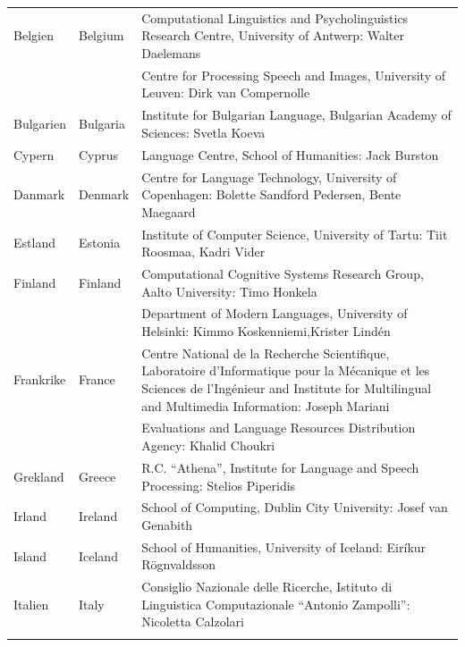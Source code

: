 \small
\begin{longtable}{llp{114mm}}
  Belgien & \textcolor{grey1}{Belgium} & Computational Linguistics and Psycholinguistics Research Centre, University of Antwerp: Walter Daelemans\\ \addlinespace
  & & Centre for Processing Speech and Images, University of Leuven: Dirk van Compernolle \\ \addlinespace
  Bulgarien & \textcolor{grey1}{Bulgaria} & Institute for Bulgarian Language, Bulgarian Academy of Sciences: Svetla Koeva \\ \addlinespace
  Cypern &  \textcolor{grey1}{Cyprus} & Language Centre, School of Humanities: Jack Burston\\ \addlinespace
  Danmark &  \textcolor{grey1}{Denmark} & Centre for Language Technology, University of Copenhagen: \newline Bolette Sandford Pedersen, Bente Maegaard\\ \addlinespace
  Estland & \textcolor{grey1}{Estonia} & Institute of Computer Science, University of Tartu: Tiit Roosmaa, Kadri Vider\\ \addlinespace
  Finland & \textcolor{grey1}{Finland} & Computational Cognitive Systems Research Group, Aalto University: Timo Honkela\\ \addlinespace
  & & Department of Modern Languages, University of Helsinki: Kimmo Koskenniemi,\newline Krister Lindén \\ \addlinespace
  Frankrike & \textcolor{grey1}{France} & Centre National de la Recherche Scientifique, Laboratoire d'Informatique pour la Mécanique et les Sciences de l'Ingénieur and Institute for Multilingual and Multimedia Information: Joseph Mariani \\ \addlinespace
  & & Evaluations and Language Resources Distribution Agency: Khalid Choukri\\ \addlinespace
  Grekland & \textcolor{grey1}{Greece} & R.C. “Athena”, Institute for
  Language and Speech Processing: Stelios Piperidis\\ \addlinespace
  Irland & \textcolor{grey1}{Ireland} & School of Computing, Dublin City University: Josef van Genabith\\ \addlinespace
  Island & \textcolor{grey1}{Iceland} & School of Humanities, University of Iceland: Eiríkur Rögnvaldsson\\ \addlinespace
  Italien & \textcolor{grey1}{Italy} & Consiglio Nazionale delle Ricerche, Istituto di Linguistica Computazionale “Antonio Zampolli”: Nicoletta Calzolari\\ \addlinespace

\end{longtable}
